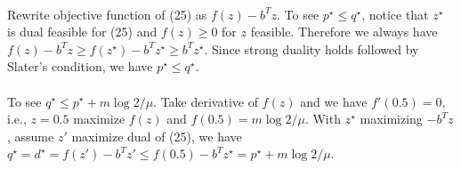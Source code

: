 \paragraph{}
Rewrite objective function of (25) as $ f(z) -b^Tz$. To see $p^{\star} \leq q^{\star}$, notice that $z^{\star}$ is dual feasible for (25) and $f(z) \geq 0$ for $z$ feasible. Therefore we always have $f(z) -b^Tz \geq f(z^{\star}) -b^Tz^{\star} \geq b^Tz^{\star}$. Since strong duality holds followed by Slater's condition, we have $p^{\star} \leq q^{\star}$.
\paragraph{}
To see $q^{\star} \leq p^{\star} + m\log2/\mu$. Take derivative of $f(z)$ and we have $f'(0.5) = 0$, i.e., $z=0.5$ maximize $f(z)$ and $f(0.5) =m\log2/\mu$. With $z^\star$ maximizing $-b^Tz$, assume $z'$ maximize dual of (25), we have $ q^\star = d^{\star} = f(z')-b^Tz' \leq f(0.5) -b^Tz^\star = p^\star + m\log2/\mu $.